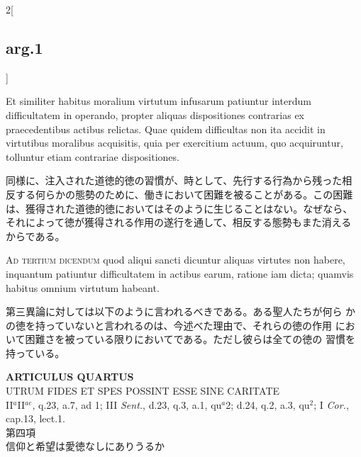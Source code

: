 \documentclass[paper=a4paper,fontsize=10pt,jafontsize=9pt,titlepage]{jlreq}
\begin{document}
\begin{paracol}{2}[\subsection{arg.1}]
\switchcolumn*

Et similiter habitus moralium virtutum infusarum patiuntur interdum
 difficultatem in operando, propter aliquas dispositiones contrarias
 ex praecedentibus actibus relictas. Quae quidem difficultas non ita
 accidit in virtutibus moralibus acquisitis, quia per exercitium
 actuum, quo acquiruntur, tolluntur etiam contrariae dispositiones.

\switchcolumn

同様に、注入された道徳的徳の習慣が、時として、先行する行為から残った相
反する何らかの態勢のために、働きにおいて困難を被ることがある。この困難
は、獲得された道徳的徳においてはそのように生じることはない。なぜなら、
それによって徳が獲得される作用の遂行を通して、相反する態勢もまた消える
からである。

\switchcolumn*[\subsection{ad.3}]

{\scshape Ad tertium dicendum} quod aliqui sancti dicuntur aliquas
 virtutes non habere, inquantum patiuntur difficultatem in actibus
 earum, ratione iam dicta; quamvis habitus omnium virtutum habeant.

\switchcolumn

第三異論に対しては以下のように言われるべきである。ある聖人たちが何ら
 かの徳を持っていないと言われるのは、今述べた理由で、それらの徳の作用
 において困難さを被っている限りにおいてである。ただし彼らは全ての徳の
 習慣を持っている。

\end{paracol}
\newpage
{}
{}
\setcounter{section}{4}
\setcounter{subsection}{0}



\begin{center}
{\Large {\bfseries ARTICULUS QUARTUS}}\\
{\large UTRUM FIDES ET SPES POSSINT ESSE SINE CARITATE}\\
{\footnotesize II$^{a}$II$^{ae}$, q.23, a.7, ad 1; III {\itshape Sent.}, d.23, q.3, a.1, qu$^{a}$2; d.24, q.2, a.3, qu$^{2}$; I {\itshape Cor.}, cap.13, lect.1.}\\
{\Large 第四項\\信仰と希望は愛徳なしにありうるか}
\end{center}
\end{document}
